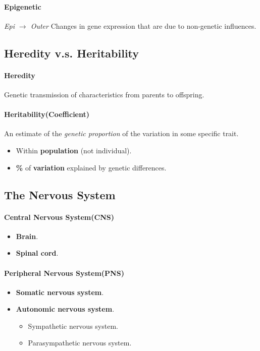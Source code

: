 \documentclass{article}
\begin{document}
	\paragraph{Epigenetic} \emph{Epi $\rightarrow$ Outer} Changes in gene expression that are due to non-genetic influences.
	\subsection{Heredity v.s. Heritability}
	\paragraph{Heredity} Genetic transmission of characteristics from parents to offspring.
	\paragraph{Heritability(Coefficient)} An estimate of the \emph{genetic proportion} of the variation in some specific trait.
	\begin{itemize}
		\item Within \textbf{population} (not individual).
		\item \textbf{\%} of \textbf{variation} explained by genetic differences.
	\end{itemize}
	\subsection{The Nervous System}
	\paragraph{Central Nervous System(CNS)}
	\begin{itemize}
		\item \textbf{Brain}.
		\item \textbf{Spinal cord}.
	\end{itemize}
	\paragraph{Peripheral Nervous System(PNS)}
	\begin{itemize}
		\item \textbf{Somatic nervous system}.
		\item \textbf{Autonomic nervous system}.
		\begin{itemize}
			\item Sympathetic nervous system.
			\item Parasympathetic nervous system.
		\end{itemize}
	\end{itemize}
\end{document}
